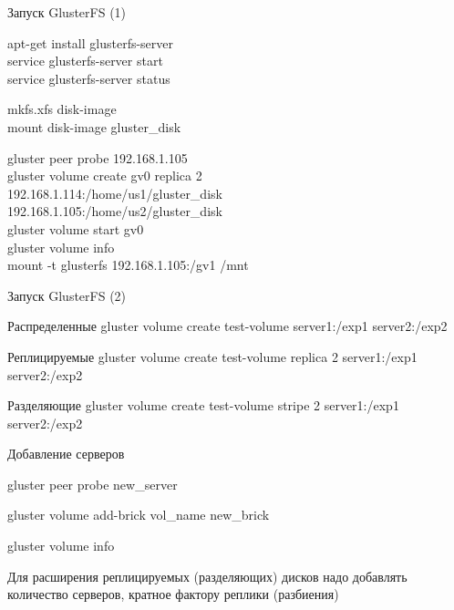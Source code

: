 \documentclass{beamer}
\begin{document}
\begin{frame}{Запуск GlusterFS (1)}
	\begin{block}{}
		apt-get install glusterfs-server\\
		service glusterfs-server start\\
		service glusterfs-server status\\
	\end{block}
	\pause
	\begin{block}{}
		mkfs.xfs disk-image\\
		mount disk-image gluster\_disk\\
	\end{block}
	\pause
	\begin{block}{}
		gluster peer probe 192.168.1.105\\
		\vspace{0.5cm}
		gluster volume create gv0 replica 2\\
		            192.168.1.114:/home/us1/gluster\_disk\\
		            192.168.1.105:/home/us2/gluster\_disk\\

		\vspace{0.5cm}
		gluster volume start gv0\\
		gluster volume info\\

		mount -t glusterfs 192.168.1.105:/gv1 /mnt
	\end{block}
\end{frame}

\begin{frame}{Запуск GlusterFS (2)}
	\begin{block}{Распределенные}
		 gluster volume create test-volume server1:/exp1 server2:/exp2
	\end{block}
	\begin{block}{Реплицируемые}
		 gluster volume create test-volume replica 2 server1:/exp1 server2:/exp2
	\end{block}
	\begin{block}{Разделяющие}
		 gluster volume create test-volume stripe 2 server1:/exp1 server2:/exp2
	\end{block}
\end{frame}

\begin{frame}{Добавление серверов}
	\begin{block}{} 
		 gluster peer probe new\_server

		\pause
		 gluster volume add-brick vol\_name new\_brick

		\pause
		 gluster volume info
	\end{block}
	\pause
	\vspace{1cm}
	Для расширения реплицируемых (разделяющих) дисков надо добавлять количество серверов, кратное фактору реплики (разбиения)
\end{frame}
\end{document}
